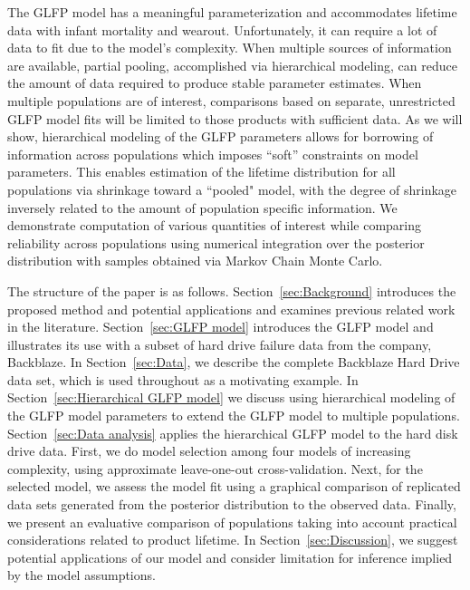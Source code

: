 \documentclass[aoas]{imsart}
\begin{document}
The GLFP model has a meaningful parameterization and accommodates lifetime data with infant mortality and wearout.  Unfortunately, it can require a lot of data to fit due to the model's complexity. When multiple sources of information are available, partial pooling, accomplished via hierarchical modeling, can reduce the amount of data required to produce stable parameter estimates. When multiple populations are of interest, comparisons based on separate, unrestricted GLFP model fits will be limited to those products with sufficient data. As we will show, hierarchical modeling of the GLFP parameters allows for borrowing of information across populations which imposes ``soft'' constraints on model parameters. This enables estimation of the lifetime distribution for all populations via shrinkage toward a ``pooled" model, with the degree of shrinkage inversely related to the amount of population specific information. We demonstrate computation of various quantities of interest while comparing reliability across populations using numerical integration over the posterior distribution with samples obtained via  Markov Chain Monte Carlo.

The structure of the paper is as follows. Section~\ref{sec:Background} introduces the proposed method and potential applications and examines previous related work in the literature.  Section~\ref{sec:GLFP model} introduces the GLFP model and illustrates its use with a subset of hard drive failure data from the company, Backblaze.  In Section~\ref{sec:Data}, we describe the complete Backblaze Hard Drive data set, which is used throughout as a motivating example. In Section~\ref{sec:Hierarchical GLFP model} we discuss using hierarchical modeling of the GLFP model parameters to extend the GLFP model to multiple populations. Section~\ref{sec:Data analysis} applies the hierarchical GLFP model to the hard disk drive data. First, we do model selection among four models of increasing complexity, using approximate leave-one-out cross-validation. Next, for the selected model, we assess the model fit using a graphical comparison of replicated data sets generated from the posterior distribution to the observed data. Finally, we present an evaluative comparison of populations taking into account practical considerations related to product lifetime. In Section~\ref{sec:Discussion}, we suggest potential applications of our model and consider limitation for inference implied by the model assumptions.
\end{document}
